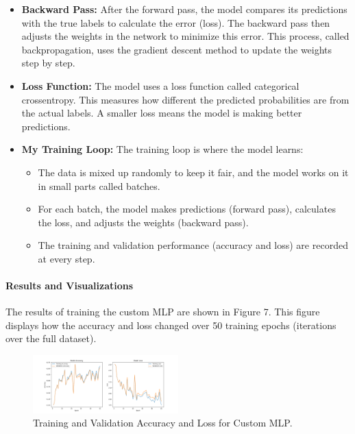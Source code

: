 \documentclass[lettersize,journal]{IEEEtran}
\begin{document}
\begin{itemize}
    \item \textbf{Backward Pass:}
    After the forward pass, the model compares its predictions with the true labels to calculate the error (loss). The backward pass then adjusts the weights in the network to minimize this error. This process, called backpropagation, uses the gradient descent method to update the weights step by step.

    \item \textbf{Loss Function:}
    The model uses a loss function called categorical crossentropy. This measures how different the predicted probabilities are from the actual labels. A smaller loss means the model is making better predictions.

    \item \textbf{My Training Loop:}
    The training loop is where the model learns:
    \begin{itemize}
        \item The data is mixed up randomly to keep it fair, and the model works on it in small parts called batches.
        \item For each batch, the model makes predictions (forward pass), calculates the loss, and adjusts the weights (backward pass).
        \item The training and validation performance (accuracy and loss) are recorded at every step.
    \end{itemize}
\end{itemize}

\paragraph{\textbf{Results and Visualizations}}

The results of training the custom MLP are shown in Figure 7. This figure displays how the accuracy and loss changed over 50 training epochs (iterations over the full dataset).

\begin{figure}[h!]
    \centering
    \includegraphics[width=0.5\textwidth]{training_history_custom_mlp.png}
    \caption{Training and Validation Accuracy and Loss for Custom MLP.}
    \label{fig:custom_training_history}
\end{figure}
\end{document}
